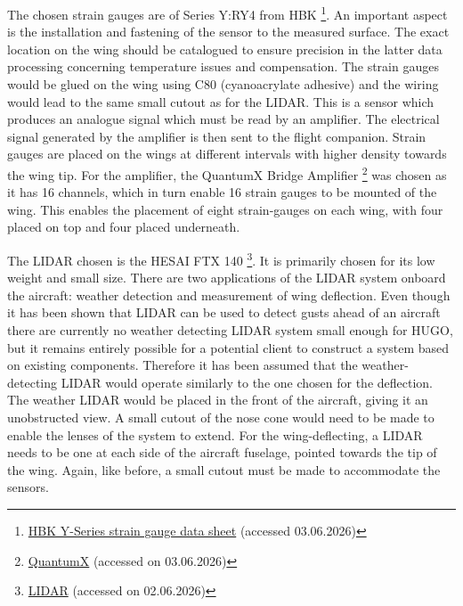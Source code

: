 The chosen strain gauges are of Series Y:RY4 from HBK \footnote{\label{foot:HBK}\href{https://delivery-p153383-e1601992.adobeaemcloud.com/adobe/assets/deliver/urn:aaid:aem:b6cbaaca-d372-4962-bc27-0ea3864fdd80/Y-Series-Data-Sheet-B04709.pdf}{HBK Y-Series strain gauge data sheet} (accessed 03.06.2026)}. An important aspect is the installation and fastening of the sensor to the measured surface. The exact location on the wing should be catalogued to ensure precision in the latter data processing concerning temperature issues and compensation. The strain gauges would be glued on the wing using  C80 (cyanoacrylate adhesive) and the wiring would lead to the same small cutout as for the LIDAR. 
This is a sensor which produces an analogue signal which must be read by an amplifier. The electrical signal generated by the amplifier is then sent to the flight companion. Strain gauges are placed on the wings at different intervals with higher density towards the wing tip. For the amplifier, the  QuantumX Bridge Amplifier \footnote{\label{foot:QuantumX}\href{https://assets.hbkworld.com/adobe/assets/deliver/urn:aaid:aem:65d123ca-53f3-487f-99c2-9bbc99c34e4b/QuantumX-MX1601B-Data-Sheet-B03882.pdf}{QuantumX} (accessed on 03.06.2026)}  was chosen as it has 16 channels, which in turn enable 16 strain gauges to be mounted of the wing. 
This enables the placement of eight strain-gauges on each wing, with four placed on top and four placed underneath. 


The LIDAR chosen is the HESAI FTX 140 \footnote{\label{foot:LIDAR}\href{https://www.hesaitech.com/product/ftx/}{LIDAR} (accessed on 02.06.2026)}. It is primarily chosen for its low weight and small size. There are two applications of the LIDAR system onboard the aircraft: weather detection and measurement of wing deflection. Even though it has been shown that LIDAR can be used to detect gusts ahead of an aircraft \cite{Schroeder2020}  there are currently no weather detecting LIDAR system small enough for HUGO, but it remains entirely possible for a potential client to construct a system based on existing components. Therefore it has been assumed that the weather-detecting LIDAR would operate similarly to the one chosen for the deflection. The weather LIDAR would be placed in the front of the aircraft, giving it an unobstructed view. A small cutout of the nose cone would need to be made to enable the lenses of the system to extend. 
For the wing-deflecting, a LIDAR needs to be one at each side of the aircraft fuselage, pointed towards the tip of the wing. Again, like before, a small cutout must be made to accommodate the sensors. 

